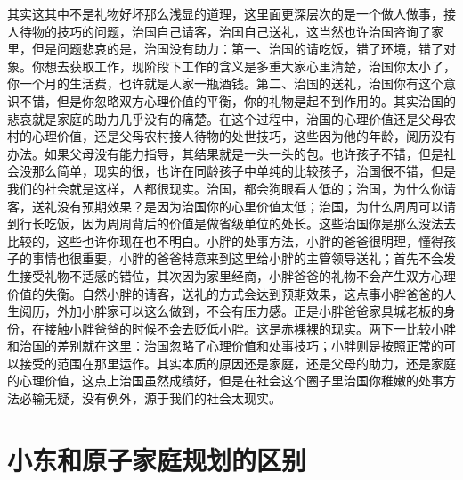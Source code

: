 其实这其中不是礼物好坏那么浅显的道理，这里面更深层次的是一个做人做事，接人待物的技巧的问题，治国自己请客，治国自己送礼，这当然也许治国咨询了家里，但是问题悲哀的是，治国没有助力：第一、治国的请吃饭，错了环境，错了对象。你想去获取工作，现阶段下工作的含义是多重大家心里清楚，治国你太小了，你一个月的生活费，也许就是人家一瓶酒钱。第二、治国的送礼，治国你有这个意识不错，但是你忽略双方心理价值的平衡，你的礼物是起不到作用的。其实治国的悲哀就是家庭的助力几乎没有的痛楚。在这个过程中，治国的心理价值还是父母农村的心理价值，还是父母农村接人待物的处世技巧，这些因为他的年龄，阅历没有办法。如果父母没有能力指导，其结果就是一头一头的包。也许孩子不错，但是社会没那么简单，现实的很，也许在同龄孩子中单纯的比较孩子，治国很不错，但是我们的社会就是这样，人都很现实。治国，都会狗眼看人低的；治国，为什么你请客，送礼没有预期效果？是因为治国你的心里价值太低；治国，为什么周周可以请到行长吃饭，因为周周背后的价值是做省级单位的处长。这些治国你是那么没法去比较的，这些也许你现在也不明白。小胖的处事方法，小胖的爸爸很明理，懂得孩子的事情也很重要，小胖的爸爸特意来到这里给小胖的主管领导送礼；首先不会发生接受礼物不适感的错位，其次因为家里经商，小胖爸爸的礼物不会产生双方心理价值的失衡。自然小胖的请客，送礼的方式会达到预期效果，这点事小胖爸爸的人生阅历，外加小胖家可以这么做到，不会有压力感。正是小胖爸爸家具城老板的身份，在接触小胖爸爸的时候不会去贬低小胖。这是赤裸裸的现实。两下一比较小胖和治国的差别就在这里：治国忽略了心理价值和处事技巧；小胖则是按照正常的可以接受的范围在那里运作。其实本质的原因还是家庭，还是父母的助力，还是家庭的心理价值，这点上治国虽然成绩好，但是在社会这个圈子里治国你稚嫩的处事方法必输无疑，没有例外，源于我们的社会太现实。

\section{小东和原子家庭规划的区别}

